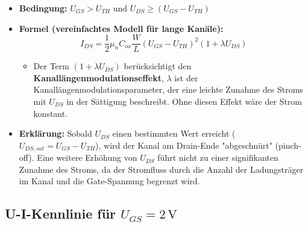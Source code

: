 \documentclass{scrarticle}
\numberwithin{equation}{section}
\begin{document}
\begin{itemize}
	\item \textbf{Bedingung:} $U_{GS} > U_{TH}$ und $U_{DS} \ge (U_{GS} - U_{TH})$
	\item \textbf{Formel (vereinfachtes Modell für lange Kanäle):}
	\begin{equation*}
		I_{DS} = \frac{1}{2} \mu_n C_{ox} \frac{W}{L} (U_{GS} - U_{TH})^2 \left( 1 + \lambda U_{DS} \right)
	\end{equation*}
	\begin{itemize}
		\item Der Term $(1 + \lambda U_{DS})$ berücksichtigt den \textbf{Kanallängenmodulationseffekt}, $\lambda$ ist der Kanallängenmodulationsparameter, der eine leichte Zunahme des Stroms mit $U_{DS}$ in der Sättigung beschreibt. Ohne diesen Effekt wäre der Strom konstant.
	\end{itemize}
	\item \textbf{Erklärung:} Sobald $U_{DS}$ einen bestimmten Wert erreicht ($U_{DS,sat} = U_{GS} - U_{TH}$), wird der Kanal am Drain-Ende "abgeschnürt" (pinch-off). Eine weitere Erhöhung von $U_{DS}$ führt nicht zu einer signifikanten Zunahme des Stroms, da der Stromfluss durch die Anzahl der Ladungsträger im Kanal und die Gate-Spannung begrenzt wird.
\end{itemize}

\subsection{U-I-Kennlinie für $U_{GS} = 2\,\mathrm{V}$}
\end{document}
